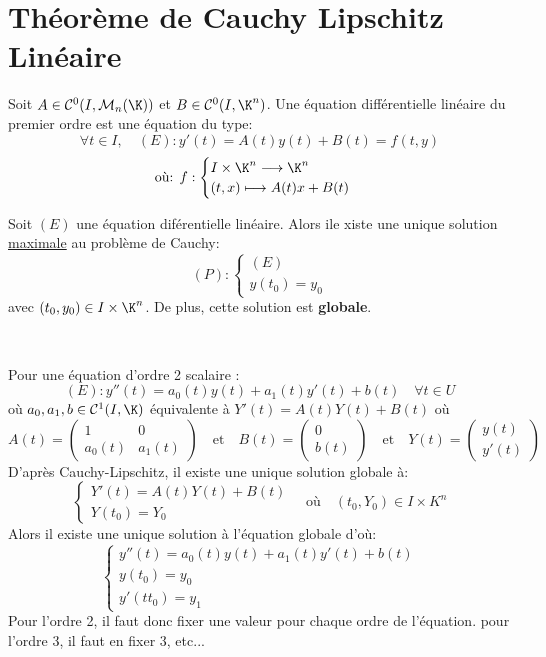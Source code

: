 \section{Théorème de Cauchy Lipschitz Linéaire} 

\begin{definition}
	Soit $A \in \mathcal{C}^0(I, \mathcal{M}_n(\K))$ et $ B \in \mathcal{C}^0(I,\K^n)$. 
	Une équation différentielle linéaire du premier ordre est une équation du type: 
		\[ \boxed{  \forall t \in I, \quad (E) : y'(t) = A(t)y(t) + B(t) = f(t,y)  } \]
		\[ \text{où: } f : 
			\begin{cases} 
				I \times \K^n \longrightarrow \K^n \\ 
				(t,x) \longmapsto A(t)x + B(t) 
			\end{cases} \]
\end{definition} 

\begin{theorem}
	Soit $(E)$ une équation diférentielle linéaire. Alors ile xiste une unique solution 
	\underline{maximale} au problème de Cauchy: 
		\[ (P) : 
			\begin{cases} 
				(E) \\ 
				y(t_0) = y_0 
			\end{cases} \] 
	avec $(t_0, y_0) \in I \times \K^n$. 
	De plus, cette solution est \textbf{globale}. 
\end{theorem} 


\begin{remark} 
	Pour une équation d'ordre 2 scalaire :
		\[ (E) : y''(t) = a_0(t)y(t) + a_1(t)y'(t) + b(t) \quad \forall t \in U \] 
	où $a_0, a_1,b \in \mathcal{C}^1(I, \K)$ équivalente à $ Y'(t) = A(t) Y(t) + B(t) $ où 
		\[ A(t) =  
			\begin{pmatrix}
				1 & 0 \\ 
				a_0(t) & a_1(t) 
			\end{pmatrix} 
			\quad \text{et} \quad B(t) = 
			\begin{pmatrix}
				0 \\ 
				b(t) 
			\end{pmatrix}
			\quad \text{et} \quad Y(t) = 
			\begin{pmatrix} 
				y(t)  \\
				y'(t) 
			\end{pmatrix} \]
	D'après Cauchy-Lipschitz, il existe une unique solution globale à: 
		\[ 
			\begin{cases} 
				Y'(t) = A(t) Y(t) + B(t) \\ 
				Y(t_0) = Y_0
			\end{cases} 
			\quad \text{où} \quad (t_0, Y_0) \in I \times K^n 
		\]
	Alors il existe une unique solution à l'équation globale d'où: 
		\[ \begin{cases} 
				y''(t) = a_0(t) y(t) + a_1(t) y'(t) + b(t) \\ 
				y(t_0) = y_0 \\ 
				y'(tt_0) = y_1 
			\end{cases} \] 
	Pour l'ordre 2, il faut donc fixer une valeur pour chaque ordre de l'équation. 
	pour l'ordre 3, il faut en fixer 3, etc...
\end{remark}


